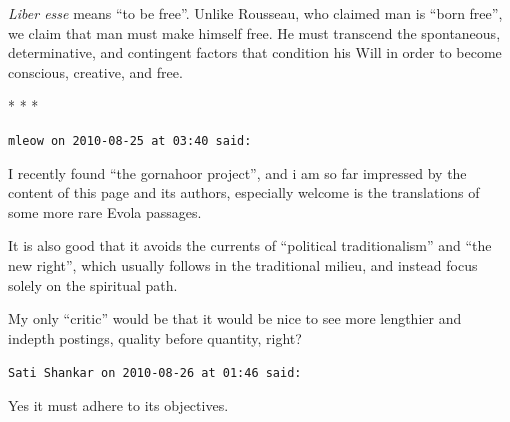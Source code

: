 \emph{Liber esse} means ``to be free''. Unlike Rousseau, who claimed man is ``born free'', we claim that man must make himself free. He must transcend the spontaneous, determinative, and contingent factors that condition his Will in order to become conscious, creative, and free.



\begin{center}* * *\end{center}

\begin{footnotesize}
\begin{sffamily}
\texttt{mleow on 2010-08-25 at 03:40 said:}

I recently found ``the gornahoor project'', and i am so far impressed by the content of this page and its authors, especially welcome is the translations of some more rare Evola passages.

It is also good that it avoids the currents of ``political traditionalism'' and ``the new right'', which usually follows in the traditional milieu, and instead focus solely on the spiritual path.

My only ``critic'' would be that it would be nice to see more lengthier and indepth postings, quality before quantity, right?

\hfill

\texttt{Sati Shankar on 2010-08-26 at 01:46 said:}

Yes it must adhere to its objectives.


\hfill

\end{sffamily}
\end{footnotesize}

